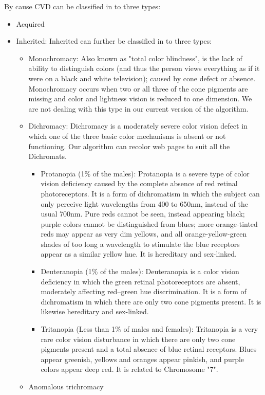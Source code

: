 By cause CVD can be classified in to three types:
\begin{itemize}
\item{Acquired}
\item{Inherited:} Inherited can further be classified in to three types:
\begin{itemize}
\item{Monochromacy:} Also known as "total color blindness", is the lack of ability to distinguish colors (and thus the person views everything as if it were on a black and white television); caused by cone defect or absence. Monochromacy occurs when two or all three of the cone pigments are missing and color and lightness vision is reduced to one dimension. We are not dealing with this type in our current version of the algorithm.
\item{Dichromacy:} Dichromacy is a moderately severe color vision defect in which one of the three basic color mechanisms is absent or not functioning. Our algorithm can recolor web pages to suit all the Dichromats.
\begin{itemize}
\item{Protanopia (1\% of the males):} Protanopia is a severe type of color vision deficiency caused by the complete absence of red retinal photoreceptors. It is a form of dichromatism in which the subject can only perceive light wavelengths from 400 to 650nm, instead of the usual 700nm. Pure reds cannot be seen, instead appearing black; purple colors cannot be distinguished from blues; more orange-tinted reds may appear as very dim yellows, and all orange-yellow-green shades of too long a wavelength to stimulate the blue receptors appear as a similar yellow hue. It is hereditary and sex-linked.
\item{Deuteranopia (1\% of the males):} Deuteranopia is a color vision deficiency in which the green retinal photoreceptors are absent, moderately affecting red–green hue discrimination. It is a form of dichromatism in which there are only two cone pigments present. It is likewise hereditary and sex-linked.
\item{Tritanopia (Less than 1\% of males and females):} Tritanopia is a very rare color vision disturbance in which there are only two cone pigments present and a total absence of blue retinal receptors. Blues appear greenish, yellows and oranges appear pinkish, and purple colors appear deep red. It is related to Chromosome "7".
\end{itemize}
\item{Anomalous trichromacy}
\end{itemize}
\end{itemize}

